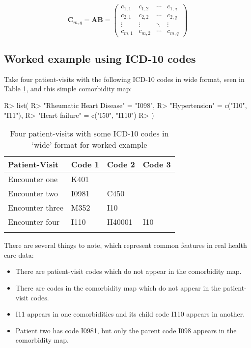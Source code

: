 \documentclass[article]{jss}
\providecommand{\tightlist}{%
  \setlength{\itemsep}{0pt}\setlength{\parskip}{0pt}}
\begin{document}
\[\boldsymbol{C}_{m,q} =
\boldsymbol{A}\boldsymbol{B} =
\begin{pmatrix}
c_{1,1} & c_{1,2} & \cdots & c_{1,q} \\
c_{2,1} & c_{2,2} & \cdots & c_{2,q} \\
\vdots  & \vdots  & \ddots & \vdots  \\
c_{m,1} & c_{m,2} & \cdots & c_{m,q}
\end{pmatrix}\]\label{eq:C}

\subsection{Worked example using ICD-10 codes}\label{workedex}

Take four patient-visits with the following ICD-10 codes in wide format,
seen in Table \ref{tab:workedexinput}, and this simple comorbidity map:

\begin{CodeChunk}

\begin{CodeInput}
R> list(
R>   "Rheumatic Heart Disease" = "I098",
R>   "Hypertension" = c("I10", "I11"),
R>   "Heart failure" = c("I50", "I110")
R> )
\end{CodeInput}
\end{CodeChunk}

\begin{longtable}[t]{l|l|l|l}
\hline
Patient-Visit & Code 1 & Code 2 & Code 3\\
\hline
Encounter one & K401 &  & \\
\hline
Encounter two & I0981 & C450 & \\
\hline
Encounter three & M352 & I10 & \\
\hline
Encounter four & I110 & H40001 & I10\\
\hline
\caption{\label{tab:workedexinput}Four patient-visits with some ICD-10 codes in `wide' format for worked example}\\
\end{longtable}

There are several things to note, which represent common features in
real health care data:

\begin{itemize}
\tightlist
\item
  There are patient-visit codes which do not appear in the comorbidity
  map.
\item
  There are codes in the comorbidity map which do not appear in the
  patient-visit codes.
\item
  I11 appears in one comorbidities and its child code I110 appears in
  another.
\item
  Patient two has code I0981, but only the parent code I098 appears in
  the comorbidity map.
\end{itemize}
\end{document}
